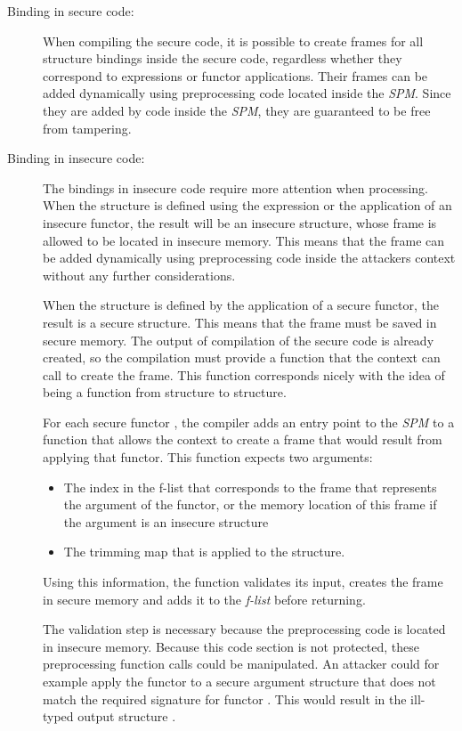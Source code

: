 \begin{description}
\item[Binding in secure code:] When compiling the secure code, it is possible to create frames for all structure bindings inside the secure code, regardless whether they correspond to  expressions or functor applications.
Their frames can be added dynamically using preprocessing code located inside the \emph{SPM}. 
Since they are added by code inside the \emph{SPM}, they are guaranteed to be free from tampering.
\item[Binding in insecure code:] The bindings in insecure code require more attention when processing.
When the structure is defined using the  expression or the application of an insecure functor, the result will be an insecure structure, whose frame is allowed to be located in insecure memory.
This means that the frame can be added dynamically using preprocessing code inside the attackers context without any further considerations.

When the structure is defined by the application of a secure functor, the result is a secure structure.
This means that the frame must be saved in secure memory.
The output of compilation of the secure code is already created, so the compilation must provide a function that the context can call to create the frame.
This function corresponds nicely with the idea of  being a function from structure to structure.

For each secure functor , the compiler adds an entry point to the \emph{SPM} to a function that allows the context to create a frame that would result from applying that functor.
This function expects two arguments: 
\begin{itemize}
\item The index in the f-list that corresponds to the frame that represents the argument of the functor, or the memory location of this frame if the argument is an insecure structure
\item The trimming map that is applied to the structure.
\end{itemize}
Using this information, the function validates its input, creates the frame in secure memory and adds it to the \emph{f-list} before returning.

The validation step is necessary because the preprocessing code is located in insecure memory.
Because this code section is not protected, these preprocessing function calls could be manipulated. 
An attacker could for example apply the functor  to a secure argument structure  that does not match the required signature for functor . 
This would result in the ill-typed output structure .


\end{description}
